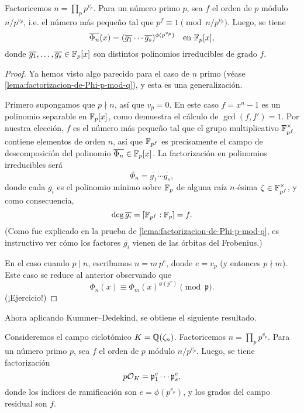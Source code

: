 \begin{lema}
  Factoricemos $n = \prod_p p^{v_p}$. Para un número primo $p$, sea $f$
  el orden de $p$ módulo $n/p^{v_p}$, i.e. el número más pequeño tal que
  $p^f \equiv 1 \pmod{n/p^{v_p}}$.
  Luego, se tiene
  \[ \overline{\Phi_n} (x) = (\overline{g_1} \cdots \overline{g_s})^{\phi (p^{v_p})}
     \quad\text{en } \mathbb{F}_p [x], \]
  donde $\overline{g_1},\ldots,\overline{g_s} \in \mathbb{F}_p [x]$ son distintos
  polinomios irreducibles de grado $f$.

  \begin{proof}
    Ya hemos visto algo parecido para el caso de $n$ primo
    (véase \ref{lema:factorizacion-de-Phi-p-mod-q}), y esta es una
    generalización.

    Primero supongamos que $p \nmid n$, así que $v_p = 0$. En este caso
    $f = x^n - 1$ es un polinomio separable en $\mathbb{F}_p [x]$, como demuestra
    el cálculo de $\gcd (f,f') = 1$. Por nuestra elección, $f$ es el número
    más pequeño tal que el grupo multiplicativo $\mathbb{F}_{p^f}^\times$ contiene
    elementos de orden $n$, así que $\mathbb{F}_{p^f}$ es precisamente el campo de
    descomposición del polinomio $\overline{\Phi_n} \in \mathbb{F}_p [x]$.
    La factorización en polinomios irreducibles será
    $$\overline{\Phi_n} = \overline{g_1} \cdots \overline{g_s},$$
    donde cada $\overline{g_i}$ es el polinomio mínimo sobre $\mathbb{F}_p$ de alguna
    raíz $n$-ésima $\zeta \in \mathbb{F}_{p^f}^\times$, y como consecuencia,
    $$\deg \overline{g_i} = [\mathbb{F}_{p^f} : \mathbb{F}_p] = f.$$
    (Como fue explicado en la prueba de \ref{lema:factorizacion-de-Phi-p-mod-q},
    es instructivo ver cómo los factores $\overline{g_i}$ vienen de las órbitas
    del Frobenius.)

    En el caso cuando $p \mid n$, escribamos $n = m\,p^e$, donde $e = v_p$
    (y entonces $p \nmid m$). Este caso se reduce al anterior observando
    que
    $$\Phi_n (x) \equiv \Phi_m (x)^{\phi (p^e)} \pmod{\mathfrak{p}}.$$
    (¡Ejercicio!)
  \end{proof}
\end{lema}

Ahora aplicando Kummer--Dedekind, se obtiene el siguiente resultado.

\begin{teorema}
  Consideremos el campo ciclotómico $K = \mathbb{Q} (\zeta_n)$. Factoricemos
  $n = \prod_p p^{v_p}$. Para un número primo $p$, sea $f$ el orden
  de $p$ módulo $n/p^{v_p}$. Luego, se tiene factorización
  $$p \mathcal{O}_K = \mathfrak{p}_1^e \cdots \mathfrak{p}_s^e,$$
  donde los índices de ramificación son $e = \phi (p^{v_p})$,
  y los grados del campo residual son $f$.
\end{teorema}

